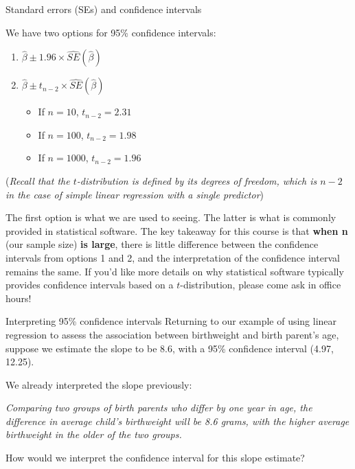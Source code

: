 \documentclass[10pt,t]{beamer}
\begin{document}
\begin{frame}{Standard errors (SEs) and confidence intervals}

We have two options for 95\% confidence intervals:
\begin{enumerate}
	\item $\hat{\beta} \pm 1.96 \times \hat{SE}(\hat{\beta})$
	\item $\hat{\beta} \pm t_{n-2} \times \hat{SE}(\hat{\beta})$
	\begin{itemize}
		\item If $n = 10$, $t_{n-2} = 2.31$
		\item If $n = 100$, $t_{n-2} = 1.98$
		\item If $n = 1000$, $t_{n-2} = 1.96$
	\end{itemize}
\end{enumerate}

\small (\textit{Recall that the $t$-distribution is defined by its \textit{degrees of freedom}, which is $n-2$ in the case of simple linear regression with a single predictor})

\vspace{0.3cm}

\normalsize The first option is what we are used to seeing. The latter is what is commonly provided in statistical software. The key takeaway for this course is that \textbf{when n} (our sample size) \textbf{is large}, there is little difference between the confidence intervals from options 1 and 2, and the interpretation of the confidence interval remains the same. If you'd like more details on why statistical software typically provides confidence intervals based on a $t$-distribution, please come ask in office hours!

\end{frame}

\begin{frame}{Interpreting 95\% confidence intervals}
Returning to our example of using linear regression to assess the association between birthweight and birth parent's age, suppose we estimate the slope to be 8.6, with a 95\% confidence interval (4.97, 12.25).

\vspace{0.3cm}

We already interpreted the slope previously:

\vspace{0.3cm}

\textit{Comparing two groups of birth parents who differ by one year in age, the difference in average child's birthweight will be 8.6 grams, with the higher average birthweight in the older of the two groups.}

\vspace{0.3cm}

How would we interpret the confidence interval for this slope estimate? %

\end{frame}
\end{document}
